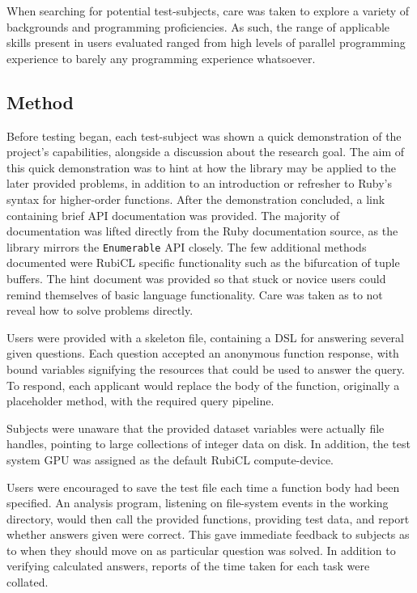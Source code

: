 When searching for potential test-subjects, care was taken to explore a variety of backgrounds and programming proficiencies.
As such, the range of applicable skills present in users evaluated ranged from high levels of parallel programming experience to barely any programming experience whatsoever.

\subsection{Method}
Before testing began, each test-subject was shown a quick demonstration of the project's capabilities, alongside a discussion about the research goal.
The aim of this quick demonstration was to hint at how the library may be applied to the later provided problems, in addition to an introduction or refresher to Ruby's syntax for higher-order functions. After the demonstration concluded, a link\cite{user_test_hints} containing brief \ac{API} documentation was provided. The majority of documentation was lifted directly from the Ruby documentation source, as the library mirrors the \verb|Enumerable| \ac{API} closely. The few additional methods documented were RubiCL specific functionality such as the bifurcation of tuple buffers. The hint document was provided so that stuck or novice users could remind themselves of basic language functionality. Care was taken as to not reveal how to solve problems directly.

Users were provided with a skeleton file, containing a DSL for answering several given questions. Each question accepted an anonymous function response, with bound variables signifying the resources that could be used to answer the query. To respond, each applicant would replace the body of the function, originally a placeholder method, with the required query pipeline.

Subjects were unaware that the provided dataset variables were actually file handles, pointing to large collections of integer data on disk. In addition, the test system \ac{GPU} was assigned as the default RubiCL compute-device.

Users were encouraged to save the test file each time a function body had been specified. An analysis program, listening on file-system events in the working directory, would then call the provided functions, providing test data, and report whether answers given were correct. This gave immediate feedback to subjects as to when they should move on as particular question was solved. In addition to verifying calculated answers, reports of the time taken for each task were collated.

